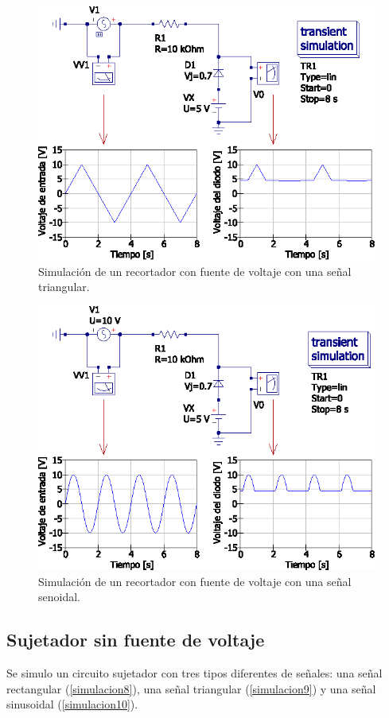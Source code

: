 \documentclass[letter,twoside,11pt]{article}
\begin{document}
{\begin{figure}[!h]
\centering
\includegraphics[scale=1.00]{simulacion/practica1.6.eps}
\caption{Simulación de un recortador con fuente de voltaje con una señal triangular.}
\label{simulacion6}
\end{figure}

\begin{figure}[!h]
\centering
\includegraphics[scale=1.00]{simulacion/practica1.7.eps}
\caption{Simulación de un recortador con fuente de voltaje con una señal senoidal.}
\label{simulacion7}
\end{figure}

\subsection{Sujetador sin fuente de voltaje}
Se simulo un circuito sujetador con tres tipos diferentes de señales: una señal
rectangular (\ref{simulacion8}), una señal triangular (\ref{simulacion9}) y una
señal sinusoidal (\ref{simulacion10}).

}
\end{document}
